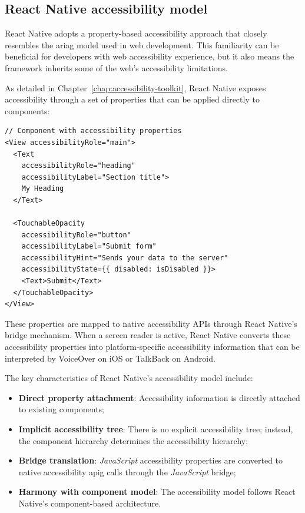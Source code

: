 \subsection{React Native accessibility model}
React Native adopts a property-based accessibility approach that closely resembles the \gls{ariag} model used in web development. This familiarity can be beneficial for developers with web accessibility experience, but it also means the framework inherits some of the web's accessibility limitations.

As detailed in Chapter~\ref{chap:accessibility-toolkit}, React Native exposes accessibility through a set of properties that can be applied directly to components:

\begin{lstlisting}[style=ReactNativeStyle, caption=React Native accessibility property model, label=lst:react-native-accessibility]
// Component with accessibility properties
<View accessibilityRole="main">
  <Text 
    accessibilityRole="heading" 
    accessibilityLabel="Section title">
    My Heading
  </Text>
  
  <TouchableOpacity
    accessibilityRole="button"
    accessibilityLabel="Submit form"
    accessibilityHint="Sends your data to the server"
    accessibilityState={{ disabled: isDisabled }}>
    <Text>Submit</Text>
  </TouchableOpacity>
</View>
\end{lstlisting}

These properties are mapped to native accessibility APIs through React Native's bridge mechanism. When a screen reader is active, React Native converts these accessibility properties into platform-specific accessibility information that can be interpreted by VoiceOver on iOS or TalkBack on Android.

The key characteristics of React Native's accessibility model include:

\begin{itemize}
    \item \textbf{Direct property attachment}: Accessibility information is directly attached to existing components;
    \item \textbf{Implicit accessibility tree}: There is no explicit accessibility tree; instead, the component hierarchy determines the accessibility hierarchy;
    \item \textbf{Bridge translation}: \textit{JavaScript} accessibility properties are converted to native accessibility \gls{apig} calls through the \textit{JavaScript} bridge;
    \item \textbf{Harmony with component model}: The accessibility model follows React Native's component-based architecture.
\end{itemize}

